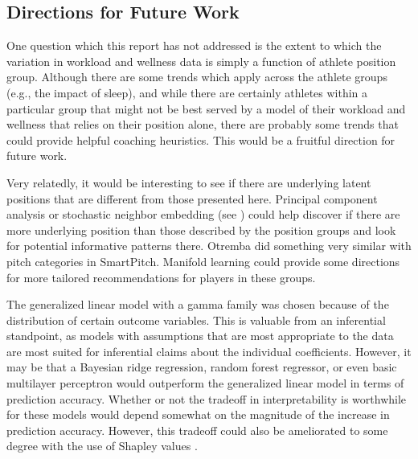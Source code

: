 \documentclass{article}
\begin{document}
		\subsection{Directions for Future Work}

			One question which this report has not addressed is the extent
			to which the variation in workload and wellness data is simply a
			function of athlete position group. Although there are some trends
			which apply across the athlete groups (e.g., the impact of sleep),
			and while there are certainly athletes within a particular group
			that might not be best served by a model of their
			workload and wellness that relies on their position alone, there
			are probably some trends that could provide helpful coaching heuristics.
			This would be a fruitful direction for future work.

			Very relatedly, it would be interesting to see if there are
			underlying latent positions that are different from those presented
			here. Principal component analysis or stochastic neighbor
			embedding (see \cite{hinton2002stochastic}) could help discover if there
			are more underlying position than those described by the position
			groups and look for potential informative patterns there.
			Otremba \cite{otremba2022smartpitch} did something very similar
			with pitch categories in SmartPitch. Manifold learning could provide
			some directions for more tailored recommendations for players in
			these groups.

			The generalized linear model with a gamma family was chosen because
			of the distribution of certain outcome variables. This is valuable
			from an inferential standpoint, as models with assumptions that are
			most appropriate to the data are most suited for inferential
			claims about the individual coefficients. However, it may be that
			a Bayesian ridge regression, random forest regressor, or even
			basic multilayer perceptron would outperform the generalized linear
			model in terms of prediction accuracy. Whether or not the tradeoff
			in interpretability is worthwhile for these models would depend
			somewhat on the magnitude of the increase in prediction accuracy.
			However, this tradeoff could also be ameliorated to some degree
			with the use of Shapley values \cite{vstrumbelj2014explaining}.

	
	
\end{document}
